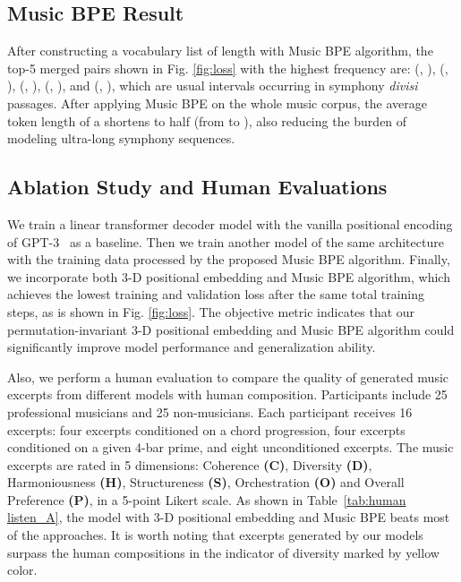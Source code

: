 \documentclass{article}
\begin{document}
\subsection{Music BPE Result}
After constructing a vocabulary list of length  with Music BPE algorithm, the top-5 merged pairs shown in Fig. \ref{fig:loss} with the highest frequency are: (, ), (, ), (, ), (, ), and (, ), which are usual intervals occurring in symphony \emph{divisi} passages. After applying Music BPE on the whole music corpus, the average token length of a  shortens to half (from  to ), also reducing the burden of modeling ultra-long symphony sequences.

\subsection{Ablation Study and Human Evaluations}
We train a linear transformer decoder model with the vanilla positional encoding of GPT-3~\cite{brown2020language} as a baseline. Then we train another model of the same architecture with the training data processed by the proposed Music BPE algorithm. Finally, we incorporate both 3-D positional embedding and Music BPE algorithm, which achieves the lowest training and validation loss after the same total training steps, as is shown in Fig. \ref{fig:loss}. The objective metric indicates that our permutation-invariant 3-D positional embedding and Music BPE algorithm could significantly improve  model performance and generalization ability.

Also, we perform a human evaluation to compare the quality of generated music excerpts from different models with human composition. Participants include 25 professional musicians and 25 non-musicians. Each participant receives 16 excerpts: four excerpts conditioned on a chord progression, four excerpts conditioned on a given 4-bar prime, and eight unconditioned excerpts. The music excerpts are rated in 5 dimensions: Coherence \textbf{(C)}, Diversity \textbf{(D)}, Harmoniousness \textbf{(H)}, Structureness \textbf{(S)}, Orchestration \textbf{(O)} and Overall Preference \textbf{(P)}, in a 5-point Likert scale. As shown in Table~\ref{tab:human listen_A}, the model with 3-D positional embedding and Music BPE beats most of the approaches. It is worth noting that excerpts generated by our models surpass the human compositions in the indicator of diversity marked by yellow color.
\end{document}
